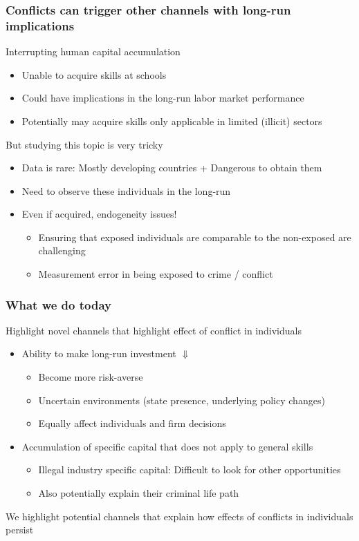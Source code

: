 \documentclass[aspectratio=169]{beamer}
\begin{document}
\begin{frame}
\frametitle{Conflicts can trigger other channels with long-run implications} 
Interrupting human capital accumulation
\begin{itemize}\setlength\itemsep{3pt}
\item Unable to acquire skills at schools
\item Could have implications in the long-run labor market performance
\item Potentially may acquire skills only applicable in limited (illicit) sectors
\end{itemize} \medskip
But studying this topic is very tricky
\begin{itemize}\setlength\itemsep{3pt}
\item Data is rare: Mostly developing countries + Dangerous to obtain them
\item Need to observe these individuals in the long-run
\item Even if acquired, endogeneity issues!
\begin{itemize}\setlength\itemsep{3pt}
  \item Ensuring that exposed individuals are comparable to the non-exposed are challenging
  \item Measurement error in being exposed to crime / conflict
\end{itemize}
\end{itemize} \medskip
\end{frame}

\begin{frame}
\frametitle{What we do today} 
Highlight novel channels that highlight effect of conflict in individuals
\begin{itemize}\setlength\itemsep{3pt}
\item Ability to make long-run investment $\Downarrow$
\begin{itemize}\setlength\itemsep{3pt}
\item Become more risk-averse
\item Uncertain environments (state presence, underlying policy changes)
\item Equally affect individuals and firm decisions
\end{itemize}
\item Accumulation of specific capital that does not apply to general skills
\begin{itemize}\setlength\itemsep{3pt}
\item Illegal industry specific capital: Difficult to look for other opportunities
\item Also potentially explain their criminal life path
\end{itemize}
\end{itemize} \medskip
We highlight potential channels that explain how effects of conflicts in individuals persist
\end{frame}
\end{document}
